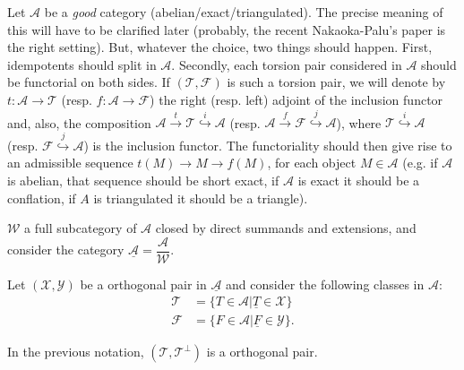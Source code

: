Let $\mathcal{A}$ be a \emph{good} category
(abelian/exact/triangulated). The precise meaning of this will have to
be clarified later (probably, the recent Nakaoka-Palu's paper is the
right setting). But, whatever the choice, two things should happen.
First, idempotents should split in $\mathcal{A}$. Secondly,  each
torsion pair considered  in $\mathcal{A}$ should be functorial on both
sides. If $(\mathcal{T},\mathcal{F})$ is such a torsion pair, we will
denote by $t:\mathcal{A}\longrightarrow\mathcal{T}$ (resp.
$f:\mathcal{A}\longrightarrow\mathcal{F}$) the right (resp. left)
adjoint of the inclusion functor and, also, the composition
$\mathcal{A}\stackrel{t}{\longrightarrow}\mathcal{T}\stackrel{i}{\hookrightarrow}\mathcal{A}$
(resp.
$\mathcal{A}\stackrel{f}{\longrightarrow}\mathcal{F}\stackrel{j}{\hookrightarrow}\mathcal{A}$),
where $\mathcal{T}\stackrel{i}{\hookrightarrow}\mathcal{A}$ (resp.
$\mathcal{F}\stackrel{j}{\hookrightarrow}\mathcal{A}$) is the inclusion
functor. The functoriality should then give rise to an admissible
sequence $t(M)\longrightarrow M\longrightarrow f(M)$, for each object
$M\in\mathcal{A}$ (e.g. if $\mathcal{A}$ is abelian, that sequence
should be short exact, if $\mathcal{A}$ is exact it should be a
conflation, if $A$ is triangulated it should be a triangle).



$\mathcal{W}$ a full subcategory of $\mathcal{A}$ closed by direct
summands and extensions, and consider the category
$\underline{\mathcal{A}}=\dfrac{\mathcal{A}}{\mathcal{W}}$.

Let $(\mathcal{X},\mathcal{Y})$ be a orthogonal pair in
$\underline{\mathcal{A}}$ and consider the following classes in
$\mathcal{A}$:
\begin{align*}
  \mathcal{T} &= \{ T\in\mathcal{A} | \underline{T}\in\mathcal{X} \} \\
  \mathcal{F} &= \{ F\in\mathcal{A} | \underline{F}\in\mathcal{Y} \}.
\end{align*}

\begin{lemma}
  In the previous notation, $(\mathcal{T}, \mathcal{T}^\perp)$ is a
orthogonal pair.
\end{lemma}

